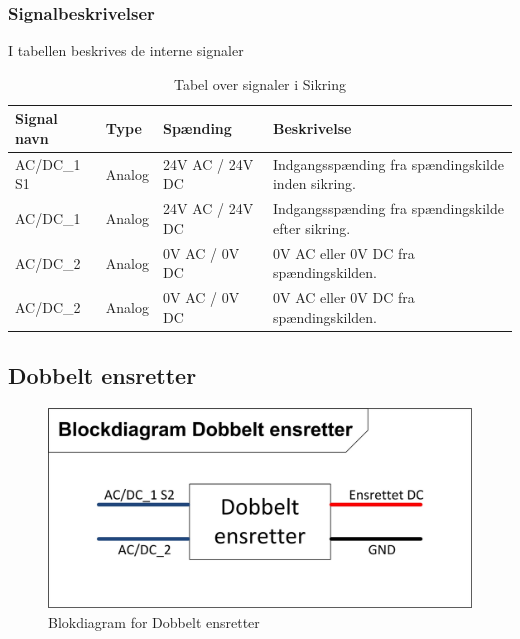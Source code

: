 \subsubsection{Signalbeskrivelser}
I tabellen beskrives de interne signaler
\begin{table}[H]
\begin{tabular}{|p{3cm}|p{3cm}|p{3cm}|p{4.5cm}|} \hline
\cellcolor[gray]{0.85}Signal navn& \cellcolor[gray]{0.85}Type &\cellcolor[gray]{0.85}Spænding&\cellcolor[gray]{0.85}Beskrivelse\\ \hline
AC/DC\_1 S1 & Analog  & 24V AC / 24V DC & Indgangsspænding fra spændingskilde inden sikring.\\  \hline
AC/DC\_1   & Analog & 24V AC / 24V DC & Indgangsspænding fra spændingskilde efter sikring. \\  \hline
AC/DC\_2 & Analog & 0V AC / 0V DC & 0V AC eller 0V DC fra spændingskilden.\\  \hline
AC/DC\_2 & Analog & 0V AC / 0V DC & 0V AC eller 0V DC fra spændingskilden.\\  \hline
\end{tabular}
\caption{Tabel over signaler i Sikring}
\label{table:SikringSignaler}
\end{table}
\newpage
\subsection{Dobbelt ensretter}
\begin{figure}[H]
\centering
\includegraphics[scale=1]{billeder/DobbeltensretterBlok}
\caption{Blokdiagram for Dobbelt ensretter}
\label{fig:DobbeltensretterBlok}
\end{figure}

